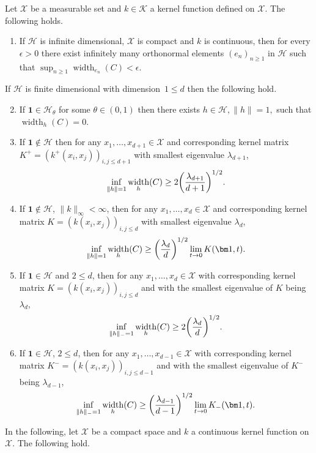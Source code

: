 \documentclass[10pt]{amsart}
\theoremstyle{definition}\newtheorem{defi}[theo]{Definition}\newtheorem{rema}[theo]{Remark}\newtheorem{exam}[theo]{Example}\newtheorem{exem}[theo]{Example}\newtheorem{nota}[theo]{Notation}
\theoremstyle{remark}
\DeclareMathOperator{\diam}{width}
\newcommand{\X}{\mathcal{X}}
\newcommand{\cH}{\mathcal{H}}
\newcommand{\clK}{\mathcal{K}}
\renewcommand*{\to}{\mathchoice{\longrightarrow}{\rightarrow}{\rightarrow}{\rightarrow}}
\let\originalleft\left
\let\originalright\right
\renewcommand{\left}{\mathopen{}\mathclose\bgroup\originalleft}
\renewcommand{\right}{\aftergroup\egroup\originalright}
\begin{document}
\begin{prop}\label{prop:approx_lower_bnd}
Let $\X$ be a measurable set and $k \in \clK$ a kernel function defined on $\X$. The following holds.
\begin{enumerate}
\item\label{prop2.10.1} If $\cH$ is infinite dimensional, $\X$ is compact and $k$ is continuous, then for every $\epsilon>0$ there exist infinitely many orthonormal elements $(e_n)_{n \geq 1}$ in $\cH$ such that $\sup_{n \geq 1} \diam_{e_n}(C) < \epsilon$.
\end{enumerate}
If $\cH$ is finite dimensional with dimension~$1 \leq d$ then the following hold.
\begin{enumerate}
\setcounter{enumi}{1}
\item\label{prop2.10.2} If $\bm 1 \in \cH_\theta$ for some $\theta\in (0,1)$ then there exists $h\in\cH, \|h\|=1,$ such that $\diam_h(C) = 0$.
\item\label{prop2.10.3} If $\bm 1 \not \in \cH$ then for any $x_1, \dots, x_{d+1} \in \X$ and corresponding kernel matrix $K^+ = (k^+(x_i,x_j))_{i,j\leq d+1}$ with smallest eigenvalue $\lambda_{d+1}$,
\[
\inf_{\|h\| = 1} \diam_h(C) \geq 2 \left(\frac{\lambda_{d+1}}{d+1}\right)^{1/2}.
\]
\item\label{prop2.10.4} If $\bm 1 \not \in \cH$, $\|k\|_\infty<\infty$, then for any $x_1, \dots, x_{d} \in \X$ and corresponding kernel matrix $K = (k(x_i,x_j))_{i,j\leq d}$ with smallest eigenvalue $\lambda_{d}$,
\[
\inf_{\|h\| = 1} \diam_h(C) \geq \left(\frac{\lambda_{d}}{d}\right)^{1/2} \lim_{t\to 0} K(\bm 1,t).
\]
\item\label{prop2.10.5} If $\bm 1 \in \cH$ and $2 \leq d$, then for any $x_1, \dots, x_{d} \in \X$ with corresponding kernel matrix $K = (k(x_i,x_j))_{i,j\leq d}$ and with the smallest eigenvalue of $K$ being $\lambda_{d}$,
\[
\inf_{\|h\|_- = 1} \diam_h(C) \geq 2 \left(\frac{\lambda_{d}}{d} \right)^{1/2}.
\]
\pagebreak{}
\item\label{prop2.10.6} If $\bm 1 \in \cH$, $2 \leq d$, then for any $x_1, \dots, x_{d-1} \in \X$ with corresponding kernel matrix $K^- = (k(x_i,x_j))_{i,j\leq d-1}$ and with the smallest eigenvalue of $K^-$ being $\lambda_{d-1}$,
\[
\inf_{\|h\|_- = 1} \diam_h(C) \geq \left(\frac{\lambda_{d-1}}{d-1} \right)^{1/2} \lim_{t \to 0} K_-(\bm 1,t).
\]
\end{enumerate}
In the following, let $\X$ be a compact space and $k$ a continuous kernel function on $\X$. The following hold.
\begin{enumerate}

\end{enumerate}
\end{prop}
\end{document}
